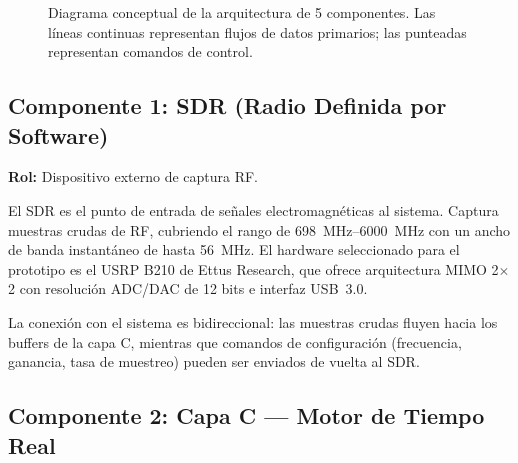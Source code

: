 \documentclass[12pt,a4paper]{article}
\begin{document}
\begin{figure}[H]
\caption{Diagrama conceptual de la arquitectura de 5 componentes. Las líneas continuas representan flujos de datos primarios; las punteadas representan comandos de control.}
\label{fig:arch}
\end{figure}

\subsection{Componente 1: SDR (Radio Definida por Software)}

\textbf{Rol:} Dispositivo externo de captura RF.

El SDR es el punto de entrada de señales electromagnéticas al sistema. Captura muestras crudas de RF, cubriendo el rango de \qtyrange{698}{6000}{\MHz} con un ancho de banda instantáneo de hasta \qty{56}{\MHz}. El hardware seleccionado para el prototipo es el USRP B210 de Ettus Research, que ofrece arquitectura MIMO 2$\times$2 con resolución ADC/DAC de 12 bits e interfaz USB~3.0.

La conexión con el sistema es bidireccional: las muestras crudas fluyen hacia los buffers de la capa C, mientras que comandos de configuración (frecuencia, ganancia, tasa de muestreo) pueden ser enviados de vuelta al SDR.

\subsection{Componente 2: Capa C --- Motor de Tiempo Real}
\end{document}
